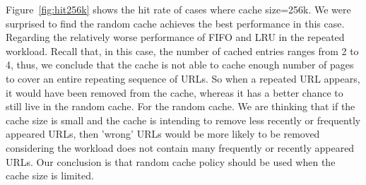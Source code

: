 \documentclass[paper=a4, fontsize=11pt]{scrartcl} %
\numberwithin{equation}{section} %
\numberwithin{figure}{section} %
\numberwithin{table}{section} %
\begin{document}
\vspace{0.5em}

Figure~\ref{fig:hit256k} shows the hit rate of cases where cache size=256k. We were surprised to find the random cache achieves the best performance in this case. Regarding the relatively worse performance of FIFO and LRU in the repeated workload. Recall that, in this case, the number of cached 
entries ranges from 2 to 4, thus, we conclude that the cache is not able to cache enough number of pages to cover an entire repeating sequence of URLs. So when a repeated URL appears, it would have been removed from the cache, whereas it has a better chance to still live in the random cache. For the random cache. We are thinking that if the cache size is small and the cache is intending to remove less recently or frequently appeared URLs, then 'wrong' URLs would be more likely to be removed considering the workload does not contain many frequently or recently appeared URLs. Our conclusion is that random cache policy should be used when the cache size is limited.    

\vspace{0.5em}
\end{document}

